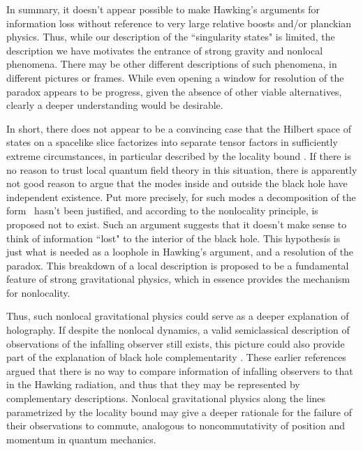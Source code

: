 In summary, it doesn't appear possible to make Hawking's arguments for information loss without 
reference to very large relative boosts and/or planckian physics. Thus, while our description of the ``singularity states" is limited, the description we have motivates the entrance of strong gravity and nonlocal phenomena.  There may be other different descriptions of such  phenomena, in different pictures or frames.
While even opening a window for resolution of the paradox appears to be progress, given the absence of other viable alternatives, clearly a deeper understanding would be desirable. 





In short, there does not appear to be a convincing case that the Hilbert space of states on a spacelike slice factorizes into separate tensor factors in sufficiently extreme circumstances, in particular described by the locality bound \locbd.  If there is no reason to trust local quantum field theory in this situation, there is apparently not  good reason to argue that the modes inside and outside the black hole have independent existence.  Put more precisely, for such modes a decomposition of the form \hilbprod\ hasn't been justified, and according to the nonlocality principle, is proposed not to exist.
Such an argument suggests that it doesn't make sense to think of  information ``lost" to the interior of the black hole.
This hypothesis is just what is needed as a loophole in Hawking's argument, and a resolution of the paradox.  This breakdown of a local description is proposed to be a fundamental feature of strong gravitational physics, which in essence provides the mechanism for nonlocality.


Thus, such nonlocal gravitational physics could serve as a deeper explanation of holography.  If despite the nonlocal dynamics, a valid semiclassical description of observations of the infalling observer still exists, this 
 picture could also provide part of the explanation of black hole complementarity .   These earlier references argued that
there is no way to compare information of infalling observers to that in the Hawking radiation, and thus that they may be represented by complementary descriptions.   Nonlocal gravitational physics along the lines parametrized by the locality bound may give a deeper rationale for the failure of their observations to commute, analogous to noncommutativity of position and momentum in quantum mechanics.  
 
